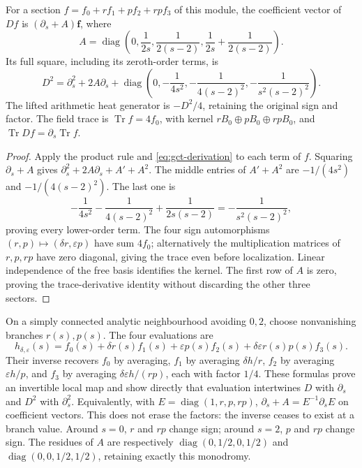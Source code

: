 \begin{proposition}\label{prop:gct-four-heat}
For a section $f=f_0+r f_1+p f_2+rp f_3$ of this module, the coefficient
vector of $Df$ is $(\partial_s+A)\mathbf f$, where
\begin{equation}\label{eq:gct-four-connection}
 A=\operatorname{diag}\left(0,\frac1{2s},\frac1{2(s-2)},
                          \frac1{2s}+\frac1{2(s-2)}\right).
\end{equation}
Its full square, including its zeroth-order terms, is
\begin{equation}\label{eq:gct-four-heat}
 D^2=\partial_s^2+2A\partial_s+
 \operatorname{diag}\left(0,-\frac1{4s^2},-
    \frac1{4(s-2)^2},-\frac1{s^2(s-2)^2}\right).
\end{equation}
The lifted arithmetic heat generator is $-D^2/4$, retaining the
original sign and factor. The field trace is $\operatorname{Tr}f=4f_0$,
with kernel $rB_0\oplus pB_0\oplus rpB_0$, and
$\operatorname{Tr}Df=\partial_s\operatorname{Tr}f$.
\end{proposition}
\begin{proof}
Apply the product rule and \eqref{eq:gct-derivation} to each term of $f$.
Squaring $\partial_s+A$ gives
$\partial_s^2+2A\partial_s+A'+A^2$. The middle entries of $A'+A^2$
are $-1/(4s^2)$ and $-1/(4(s-2)^2)$. The last one is
\[
 -\frac1{4s^2}-\frac1{4(s-2)^2}+\frac1{2s(s-2)}
 =-\frac1{s^2(s-2)^2},
\]
proving every lower-order term. The four sign automorphisms
$(r,p)\mapsto(\delta r,\varepsilon p)$ have sum $4f_0$; alternatively
the multiplication matrices of $r,p,rp$ have zero diagonal, giving
the trace even before localization. Linear independence of the free
basis identifies the kernel. The first row of $A$ is zero, proving
the trace-derivative identity without discarding the other three sectors.
\end{proof}

On a simply connected analytic neighbourhood avoiding $0,2$, choose
nonvanishing branches $r(s),p(s)$. The four evaluations are
\[
 h_{\delta,\varepsilon}(s)=f_0(s)+\delta r(s)f_1(s)
       +\varepsilon p(s)f_2(s)+\delta\varepsilon r(s)p(s)f_3(s).
\]
Their inverse recovers $f_0$ by averaging, $f_1$ by averaging
$\delta h/r$, $f_2$ by averaging $\varepsilon h/p$, and $f_3$ by
averaging $\delta\varepsilon h/(rp)$, each with factor $1/4$.
These formulas prove an invertible local map and show directly that
evaluation intertwines $D$ with $\partial_s$ and $D^2$ with
$\partial_s^2$. Equivalently, with
$E=\operatorname{diag}(1,r,p,rp)$,
$\partial_s+A=E^{-1}\partial_s E$ on coefficient vectors.
This does not erase the factors: the inverse ceases to exist at a branch
value. Around $s=0$, $r$ and $rp$ change sign; around $s=2$, $p$ and
$rp$ change sign. The residues of $A$ are respectively
$\operatorname{diag}(0,1/2,0,1/2)$ and
$\operatorname{diag}(0,0,1/2,1/2)$, retaining exactly this monodromy.

